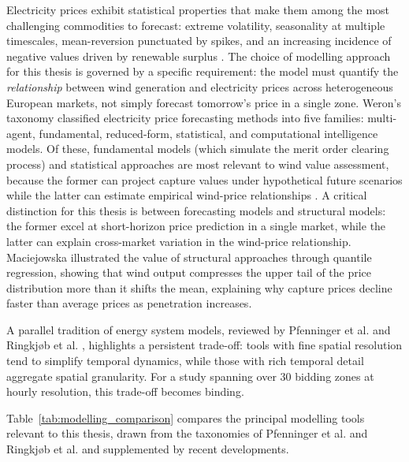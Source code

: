 Electricity prices exhibit statistical properties that make them among the most challenging commodities to forecast: extreme volatility, seasonality at multiple timescales, mean-reversion punctuated by spikes, and an increasing incidence of negative values driven by renewable surplus \cite{Weron2014}. The choice of modelling approach for this thesis is governed by a specific requirement: the model must quantify the \textit{relationship} between wind generation and electricity prices across heterogeneous European markets, not simply forecast tomorrow's price in a single zone. Weron's \cite{Weron2014} taxonomy classified electricity price forecasting methods into five families: multi-agent, fundamental, reduced-form, statistical, and computational intelligence models. Of these, fundamental models (which simulate the merit order clearing process) and statistical approaches are most relevant to wind value assessment, because the former can project capture values under hypothetical future scenarios while the latter can estimate empirical wind-price relationships \cite{Mendes2024, Lago2021}. A critical distinction for this thesis is between forecasting models and structural models: the former excel at short-horizon price prediction in a single market, while the latter can explain cross-market variation in the wind-price relationship. Maciejowska \cite{Maciejowska2020} illustrated the value of structural approaches through quantile regression, showing that wind output compresses the upper tail of the price distribution more than it shifts the mean, explaining why capture prices decline faster than average prices as penetration increases.

\vspace{4pt}

A parallel tradition of energy system models, reviewed by Pfenninger et al. \cite{Pfenninger2014} and Ringkj{\o}b et al. \cite{Ringkjob2018}, highlights a persistent trade-off: tools with fine spatial resolution tend to simplify temporal dynamics, while those with rich temporal detail aggregate spatial granularity. For a study spanning over 30 bidding zones at hourly resolution, this trade-off becomes binding.

\vspace{4pt}

Table~\ref{tab:modelling_comparison} compares the principal modelling tools relevant to this thesis, drawn from the taxonomies of Pfenninger et al. \cite{Pfenninger2014} and Ringkj{\o}b et al. \cite{Ringkjob2018} and supplemented by recent developments.

